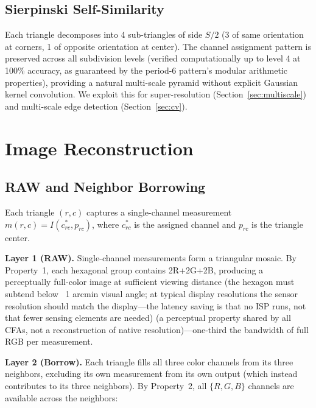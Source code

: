 \documentclass[10pt,twocolumn,letterpaper]{article}
\begin{document}
\subsection{Sierpinski Self-Similarity}

Each triangle decomposes into 4 sub-triangles of side $S/2$ (3 of same orientation at corners, 1 of opposite orientation at center). The channel assignment pattern is preserved across all subdivision levels (verified computationally up to level 4 at 100\% accuracy, as guaranteed by the period-6 pattern's modular arithmetic properties), providing a natural multi-scale pyramid without explicit Gaussian kernel convolution. We exploit this for super-resolution (Section~\ref{sec:multiscale}) and multi-scale edge detection (Section~\ref{sec:cv}).

\section{Image Reconstruction}
\label{sec:recon}

\subsection{RAW and Neighbor Borrowing}\label{sec:perm}

Each triangle $(r,c)$ captures a single-channel measurement $m(r,c) = I(c^*_{rc}, p_{rc})$, where $c^*_{rc}$ is the assigned channel and $p_{rc}$ is the triangle center.

\textbf{Layer 1 (RAW).} Single-channel measurements form a triangular mosaic. By Property~1, each hexagonal group contains 2R+2G+2B, producing a perceptually full-color image at sufficient viewing distance (the hexagon must subtend below ~1 arcmin visual angle; at typical display resolutions the sensor resolution should match the display---the latency saving is that no ISP runs, not that fewer sensing elements are needed) (a perceptual property shared by all CFAs, not a reconstruction of native resolution)---one-third the bandwidth of full RGB per measurement.

\textbf{Layer 2 (Borrow).} Each triangle fills all three color channels from its three neighbors, excluding its own measurement from its own output (which instead contributes to its three neighbors). By Property~2, all $\{R,G,B\}$ channels are available across the neighbors:
\end{document}
